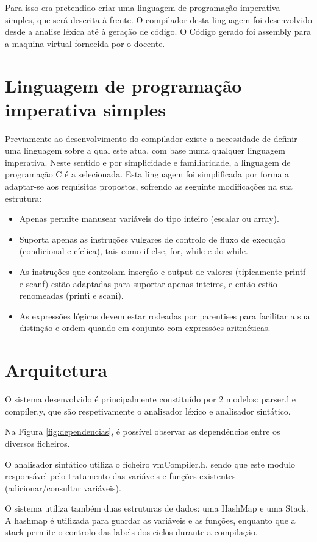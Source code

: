 \documentclass[a4paper,10pt]{report}
\begin{document}
Para isso era pretendido criar uma linguagem de programação imperativa simples, que será descrita à frente.
O compilador desta linguagem foi desenvolvido desde a analise léxica até à geração de código. O Código gerado foi assembly para a maquina virtual fornecida por o docente.


\section{Linguagem de programação imperativa simples}
    Previamente ao desenvolvimento do compilador existe a necessidade de definir uma linguagem sobre a qual este atua, com base numa qualquer linguagem imperativa. Neste sentido e por simplicidade e familiaridade, a linguagem de programação C é a selecionada. Esta linguagem foi simplificada por forma a adaptar-se aos requisitos propostos, sofrendo as seguinte modificações na sua estrutura:
\begin{itemize}

    \item Apenas permite manusear variáveis do tipo inteiro (escalar ou array).
    \item Suporta apenas as instruções vulgares de controlo de fluxo de execução (condicional e cíclica), tais como if-else, for, while e do-while.
    \item As instruções que controlam inserção e output de valores (tipicamente printf e scanf) estão adaptadas para suportar apenas inteiros, e então estão renomeadas (printi e scani).
    \item As expressões lógicas devem estar rodeadas por parentises para facilitar a sua distinção e ordem quando em conjunto com expressões aritméticas. 
\end{itemize}


\section{Arquitetura}
    O sistema desenvolvido é principalmente constituído por 2 modelos: parser.l e compiler.y, que são respetivamente o analisador léxico e analisador sintático. 

    Na Figura \ref{fig:dependencias}, é possível observar as dependências entre os diversos ficheiros.

    O analisador sintático utiliza o ficheiro vmCompiler.h, sendo que este modulo responsável pelo tratamento das variáveis e funções existentes (adicionar/consultar variáveis).

    O sistema utiliza também duas estruturas de dados: uma HashMap e uma Stack. A hashmap é utilizada para guardar as variáveis e as funções, enquanto que a stack permite o controlo das labels dos ciclos durante a compilação.
\end{document}
